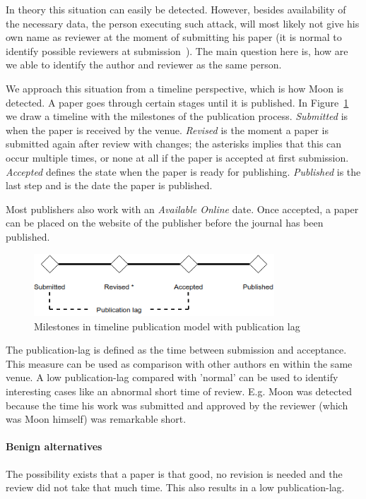 \documentclass{ou-report}
\begin{document}
In theory this situation can easily be detected. However, besides 
availability of the necessary data, the person executing such attack, will 
most likely not give his own name as reviewer at the moment of submitting his 
paper (it is 
normal to identify possible reviewers at submission~\cite{C2013}). The main
question here 
is, how are we able to identify the author and reviewer as the same person.

We approach this situation from a timeline perspective, which is how Moon is 
detected. A paper goes through certain stages until it is published. In
Figure~\ref{fig:timeline} we draw a timeline with the milestones of the
publication process. \textit{Submitted} is when the paper is received by the
venue. \textit{Revised} is the moment a paper is submitted again after review
with changes; the asterisks implies that this can occur multiple times, or none
at all if the paper is accepted at first submission. \textit{Accepted} defines
the state when the paper is ready for publishing. \textit{Published} is the last
step and is the date the paper is published.

Most publishers also work with an \textit{Available Online} date. Once accepted,
a paper can be placed on the website of the publisher before the journal has
been published.

\begin{figure}[H]
\centering
\includegraphics[width=9cm]{images/timeline.drawio.png}
\caption{Milestones in timeline publication model with publication lag}
\label{fig:timeline}
\end{figure}

The publication-lag is defined as the time between submission and acceptance.
This measure can be used as comparison with other authors en within 
the same venue. A low publication-lag compared with 'normal' can be used to 
identify interesting cases like an abnormal short time of review. E.g. Moon was
detected because the time his work was submitted and approved by the
reviewer (which was Moon himself) was remarkable short.
\paragraph{Benign alternatives}
The possibility exists that a paper is that good, no revision is needed and the 
review did not take that much time. This also results in a low publication-lag.
\end{document}
